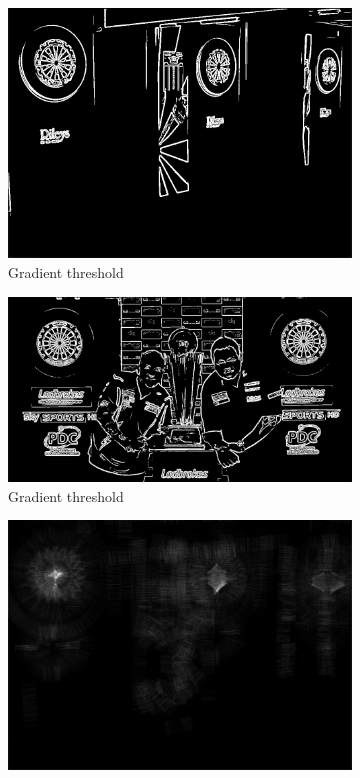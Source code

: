 \documentclass[conference]{IEEEtran}
\begin{document}
\begin{figure}[htb]
\centering
\begin{subfigure}{.5\linewidth}
  \centering
  \includegraphics[width=.9\linewidth]{images/task3/bestthresh.png}
  \caption*{Gradient threshold}
  \label{fig:sub1}
\end{subfigure}%
\begin{subfigure}{.5\linewidth}
\vspace{0.78cm}
  \centering
  \includegraphics[width=.9\linewidth]{images/task3/worstthresh.png}
  \caption*{Gradient threshold}
  \label{fig:sub2}
\end{subfigure}
\begin{subfigure}{.5\linewidth}
\vspace{0.3cm}
  \centering
  \includegraphics[width=.9\linewidth]{images/task3/bestcirclehough.png}

\end{subfigure}
\end{figure}
\end{document}
